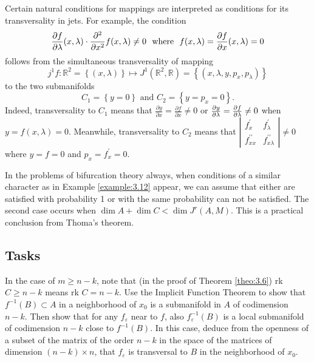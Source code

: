 \begin{example}\label{example:3.12}
	Certain natural conditions for mappings are interpreted as conditions for its transversality in jets. For example, the condition
	$$
	\frac{\partial f}{\partial \lambda }(x,\lambda )\cdot \frac{\partial ^{2}}{%
		\partial x^{2}}f(x,\lambda )\not=0\text{ \ where \ }f(x,\lambda )=\frac{%
		\partial f}{\partial x}(x,\lambda )=0
	$$
	follows from the simultaneous transversality of mapping
	$$
	j^{1}f:\mathbb{R}^{2}=\left\{ \left( x,\lambda \right) \right\} \longmapsto
	J^{1}(\mathbb{R}^{2},\mathbb{R})=\left\{ \left( x,\lambda
	,y,p_{x},p_{\lambda }\right) \right\}
	$$
	to the two submanifolds $$
	C_{1}=\left\{ y=0\right\} \text{ \ and \ }C_{2}=\left\{ y=p_{x}=0\right\} .
	$$
	Indeed, transversality to $C_{1}$ means that $\frac{\partial
	y}{\partial x}=\frac{\partial f}{\partial x}\not=0$ or $\frac{\partial y}{%
	\partial \lambda }=\frac{\partial f}{\partial \lambda }\not=0$ when $y=f(x,\lambda )=0.$
	Meanwhile, transversality to $C_{2}$ means that $\left\vert
	\begin{array}{ll}
	f_{x}^{\prime } & f_{\lambda }^{\prime } \\
	f_{xx}^{\prime \prime } & f_{x\lambda }^{\prime \prime }%
	\end{array}%
	\right\vert \not=0$ where $y=f=0$ and $p_{x}=f_{x}^{\prime }=0.$
\end{example}
\bigskip
In the problems of bifurcation theory always, when conditions of a similar character as in Example \ref{example:3.12} appear, we can assume that either are satisfied with probability 1 or with the same probability can not be satisfied. The second case occurs when $\dim A+\dim C<\dim J^{r}(A,M).$ This is a practical conclusion from Thoma's theorem.

\subsection*{Tasks}
\begin{task}
	In the case of $m\geq n-k$, note that (in the proof of Theorem \ref{theo:3.6}) rk$C\geq n-k$ means rk $C=n-k$. Use the Implicit Function Theorem to show that $f^{-1}(B)\subset A$ in a neighborhood of $x_{0}$ is a submanifold in $A$ of codimension $n - k$. Then show that for any $f_{\varepsilon }$ near to $f$, also $f_{\varepsilon }^{-1}(B)$ is a local submanifold of codimension $n-k$ close to $f^{-1}(B)$. In this case, deduce from the openness of a subset of the matrix of the order $n-k$ in the space of the matrices of dimension $(n-k)\times n$, that $f_{\varepsilon }$ is transversal to $B$ in the neighborhood of $x_0$.
\end{task}

